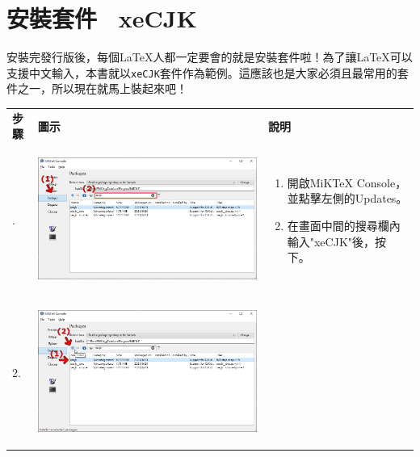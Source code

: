 \documentclass{../indiv}
\begin{document}
	\section{安裝套件 \textemdash\ xeCJK}
	安裝完發行版後，每個\LaTeX 人都一定要會的就是安裝套件啦！為了讓\LaTeX 可以支援中文輸入，本書就以\texttt{xeCJK}套件作為範例。這應該也是大家必須且最常用的套件之一，所以現在就馬上裝起來吧！
	\begin{table}[H]
		\centering
		\OSfamily
		\setlength{\tabcolsep}{10pt}
		\begin{tabular}{Z}
			\Thline
			 \textrm{\textbf{\large 步驟}} & \textbf{\large 圖示} & \textbf{\large 說明}\\. &
			\begin{tabmp}[-0.2]
				\centering
				\includegraphics[width=\linewidth]{xecjk-install-1.png}
			\end{tabmp} &
			\begin{tabmp}
				\begin{enumerate}[label=\texttt{(\arabic*)}, nosep, left=0pt, labelsep=0.5ex]
					\item 開啟MiKTeX Console，並點擊左側的Updates。
					\item 在畫面中間的搜尋欄內輸入"xeCJK"後，按下\Enter。
				\end{enumerate}
			\end{tabmp}\\
			2. &
			\begin{tabmp}[-0.2]
				\centering
				\includegraphics[width=\linewidth]{xecjk-install-2.png}

\end{tabmp}
\end{tabular}
\end{table}
\end{document}
